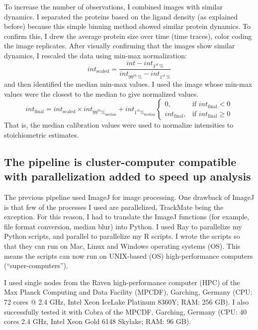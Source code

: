To increase the number of observations, I combined images with similar dynamics. I separated the proteins based on the ligand density (as explained before) because this simple binning method showed similar protein dynamics. To confirm this, I drew the average protein size over time (time traces), color coding the image replicates. After visually confirming that the images show similar dynamics, I rescaled the data using min-max normalization:
\begin{equation}
int_\text{scaled} = \frac{int - int_{1^{st}\,\%}}{int_{99^{th}\,\%} - int_{1^{st}\,\%}}
\end{equation}
and then identified the median min-max values. I used the image whose min-max values were the closest to the median to give normalized values.
\begin{equation}
int_\text{final} = int_\text{scaled} \times int_{99^{th} \%_\text{median}}+int_{1^{st} \%_\text{median}}
\left\{\begin{array}{lr}
0, & \text{if }int_\text{final} < 0\\
int_\text{final}, & \text{if }int_\text{final} \geq 0
\end{array}\right.
\end{equation}
That is, the median calibration values were used to normalize intensities to stoichiometric estimates.

\subsection{The pipeline is cluster-computer compatible with parallelization added to speed up analysis}
The previous pipeline used ImageJ for image processing. One drawback of ImageJ is that few of the processes I used are parallelized, TrackMate being the exception. For this reason, I had to translate the ImageJ functions (for example, file format conversion, median blur) into Python. I used Ray to parallelize my Python scripts, and parallel to parallelize my R scripts. I wrote the scripts so that they can run on Mac, Linux and Windows operating systems (OS). This means the scripts can now run on UNIX-based (OS) high-performance computers (“super-computers”).

I used single nodes from the Raven high-performance computer (HPC) of the Max Planck Computing and Data Facility (MPCDF), Garching, Germany (CPU: 72 cores @ 2.4 GHz, Intel Xeon IceLake Platinum 8360Y; RAM: 256 GB). I also successfully tested it with Cobra of the MPCDF, Garching, Germany (CPU: 40 cores \@ 2.4 GHz, Intel Xeon Gold 6148 Skylake; RAM: 96 GB).

